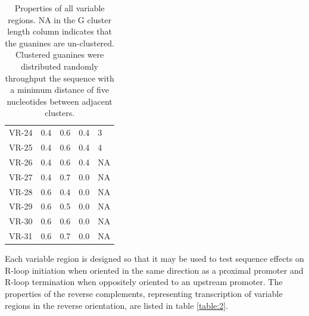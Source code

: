 \documentclass[11pt]{article}
\begin{document}
\begin{table}
\begin{tabular}{lrrrl}
	VR-24 &      0.4 &         0.6 &      0.4 &              3 \\
	VR-25 &      0.4 &         0.6 &      0.4 &              4 \\
	VR-26 &      0.4 &         0.6 &      0.4 &             NA \\
	VR-27 &      0.4 &         0.7 &      0.0 &             NA \\
	VR-28 &      0.6 &         0.4 &      0.0 &             NA \\
	VR-29 &      0.6 &         0.5 &      0.0 &             NA \\
	VR-30 &      0.6 &         0.6 &      0.0 &             NA \\
	VR-31 &      0.6 &         0.7 &      0.0 &             NA \\
	\bottomrule
\end{tabular}
\caption{Properties of all variable regions. NA in the G cluster length column indicates that the guanines are un-clustered. Clustered guanines were distributed randomly throughput the sequence with a minimum distance of five nucleotides between adjacent clusters.}
\label{table:1}
\end{table}


Each variable region is designed so that it may be used to test sequence effects on R-loop initiation when oriented in the same direction as a proximal promoter and R-loop termination when oppositely oriented to an upstream promoter. The properties of the reverse complements, representing transcription of variable regions in the reverse orientation, are listed in table \ref{table:2}. 
\end{document}
